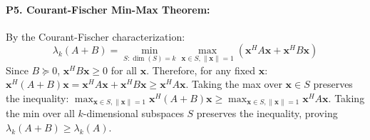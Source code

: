 \paragraph{P5. Courant-Fischer Min-Max Theorem:}
By the Courant-Fischer characterization:
\[
\lambda_k(A + B) = \min_{S: \dim(S)=k} \max_{\mathbf{x} \in S, \|\mathbf{x}\|=1} \left( \mathbf{x}^H A \mathbf{x} + \mathbf{x}^H B \mathbf{x} \right)
\]
Since $B \succeq 0$, $\mathbf{x}^H B \mathbf{x} \ge 0$ for all $\mathbf{x}$.
Therefore, for any fixed $\mathbf{x}$: $\mathbf{x}^H (A + B) \mathbf{x} = \mathbf{x}^H A \mathbf{x} + \mathbf{x}^H B \mathbf{x} \ge \mathbf{x}^H A \mathbf{x}$.
Taking the max over $\mathbf{x} \in S$ preserves the inequality: $\max_{\mathbf{x} \in S, \|\mathbf{x}\|=1} \mathbf{x}^H (A+B)\mathbf{x} \ge \max_{\mathbf{x} \in S, \|\mathbf{x}\|=1} \mathbf{x}^H A \mathbf{x}$.
Taking the min over all $k$-dimensional subspaces $S$ preserves the inequality, proving $\lambda_k(A + B) \ge \lambda_k(A)$.

